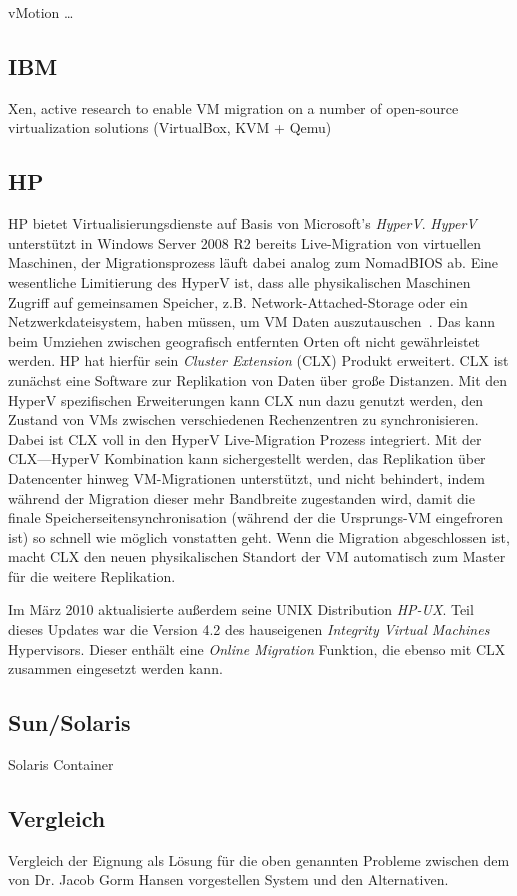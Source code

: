 vMotion \ldots

\subsection{IBM}
Xen, active research to enable VM migration on a number of open-source
virtualization solutions (VirtualBox, KVM + Qemu)

\subsection{HP}
HP bietet Virtualisierungsdienste auf Basis von Microsoft's
\emph{HyperV}. \emph{HyperV} unterstützt in Windows Server 2008 R2
bereits Live-Migration von virtuellen Maschinen, der Migrationsprozess
läuft dabei analog zum NomadBIOS ab. Eine wesentliche Limitierung des
HyperV ist, dass alle physikalischen Maschinen Zugriff auf gemeinsamen
Speicher, z.B. Network-Attached-Storage oder ein Netzwerkdateisystem,
haben müssen, um VM Daten auszutauschen~\cite{hp2010hyperV}. Das kann
beim Umziehen zwischen geografisch entfernten Orten oft nicht
gewährleistet werden. HP hat hierfür sein \emph{Cluster Extension}
(CLX) Produkt erweitert. CLX ist zunächst eine Software zur
Replikation von Daten über große Distanzen. Mit den HyperV
spezifischen Erweiterungen kann CLX nun dazu genutzt werden, den
Zustand von VMs zwischen verschiedenen Rechenzentren zu
synchronisieren. Dabei ist CLX voll in den HyperV Live-Migration
Prozess integriert. Mit der CLX---HyperV Kombination kann
sichergestellt werden, das Replikation über Datencenter hinweg
VM-Migrationen unterstützt, und nicht behindert, indem während der
Migration dieser mehr Bandbreite zugestanden wird, damit die finale
Speicherseitensynchronisation (während der die Ursprungs-VM
eingefroren ist) so schnell wie möglich vonstatten geht. Wenn die
Migration abgeschlossen ist, macht CLX den neuen physikalischen
Standort der VM automatisch zum Master für die weitere Replikation.

Im März 2010 aktualisierte außerdem seine UNIX Distribution
\emph{HP-UX}. Teil dieses Updates war die Version 4.2 des hauseigenen
\emph{Integrity Virtual Machines} Hypervisors. Dieser enthält eine
\emph{Online Migration} Funktion, die ebenso mit CLX zusammen
eingesetzt werden kann.

\subsection{Sun/Solaris}
Solaris Container

\subsection{Vergleich}
Vergleich der Eignung als Lösung für die oben genannten Probleme
zwischen dem von Dr. Jacob Gorm Hansen vorgestellen System und den Alternativen.


